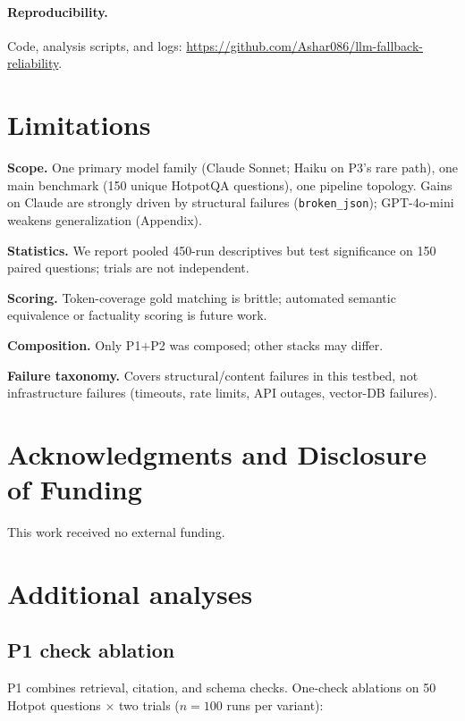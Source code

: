 \documentclass{article}
\begin{document}
\paragraph{Reproducibility.}
Code, analysis scripts, and logs: \url{https://github.com/Ashar086/llm-fallback-reliability}.

\section{Limitations}
\label{sec:limitations}

\textbf{Scope.} One primary model family (Claude Sonnet; Haiku on P3's rare path), one main benchmark (150 unique HotpotQA questions), one pipeline topology. Gains on Claude are strongly driven by structural failures (\texttt{broken\_json}); GPT-4o-mini weakens generalization (Appendix).

\textbf{Statistics.} We report pooled 450-run descriptives but test significance on 150 paired questions; trials are not independent.

\textbf{Scoring.} Token-coverage gold matching is brittle; automated semantic equivalence or factuality scoring is future work.

\textbf{Composition.} Only P1$+$P2 was composed; other stacks may differ.

\textbf{Failure taxonomy.} Covers structural/content failures in this testbed, not infrastructure failures (timeouts, rate limits, API outages, vector-DB failures).

\section*{Acknowledgments and Disclosure of Funding}
This work received no external funding.




\appendix
\section{Additional analyses}
\label{app:extra}

\subsection{P1 check ablation}
\label{sec:p1-ablation}
P1 combines retrieval, citation, and schema checks. One-check ablations on 50 Hotpot questions $\times$ two trials ($n{=}100$ runs per variant):
\end{document}
